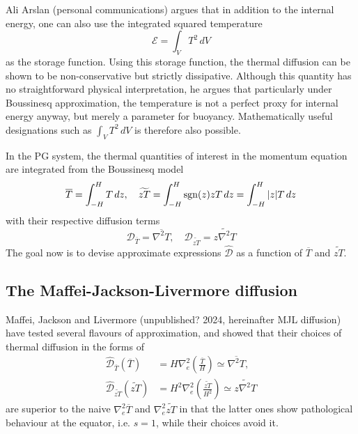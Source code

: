 Ali Arslan (personal communications) argues that in addition to the internal energy, one can also use the integrated squared temperature
\[
    \mathcal{E} = \int_V T^2 \, dV
\]
as the storage function. Using this storage function, the thermal diffusion can be shown to be non-conservative but strictly dissipative. Although this quantity has no straightforward physical interpretation, he argues that particularly under Boussinesq approximation, the temperature is not a perfect proxy for internal energy anyway, but merely a parameter for buoyancy. Mathematically useful designations such as $\int_V T^2\, dV$ is therefore also possible.


\medskip

In the PG system, the thermal quantities of interest in the momentum equation are integrated from the Boussinesq model
\[
    \overline{T} = \int_{-H}^H T \, dz,\quad \widetilde{zT} = \int_{-H}^H \operatorname{sgn}(z)z T\, dz = \int_{-H}^H |z|T \, dz
\]
with their respective diffusion terms
\begin{equation}\label{eqn:diff-T-PG}
    \mathcal{D}_{\overline{T}} = \overline{\nabla^2 T}, \quad \mathcal{D}_{\widetilde{zT}} = \widetilde{z\nabla^2 T}
\end{equation}
The goal now is to devise approximate expressions $\hat{\mathcal{D}}$ as a function of $\overline{T}$ and $\widetilde{zT}$. 

\subsection{The Maffei-Jackson-Livermore diffusion}

Maffei, Jackson and Livermore (unpublished? 2024, hereinafter MJL diffusion) have tested several flavours of approximation, and showed that their choices of thermal diffusion in the forms of
\begin{equation}\label{eqn:diff-T-PG-Maffei}
\begin{aligned}
    \hat{\mathcal{D}}_{\overline{T}}(\overline{T}) &= H \nabla_e^2 \left(\frac{\overline{T}}{H}\right) \simeq \overline{\nabla^2 T}, \\
    \hat{\mathcal{D}}_{\widetilde{zT}}(\widetilde{zT}) &= H^2 \nabla_e^2 \left(\frac{\widetilde{zT}}{H^2}\right) \simeq \widetilde{z\nabla^2 T}
\end{aligned}
\end{equation}
are superior to the naive $\nabla_e^2 \overline{T}$ and $\nabla_e^2 \widetilde{zT}$ in that the latter ones show pathological behaviour at the equator, i.e. $s=1$, while their choices avoid it.

